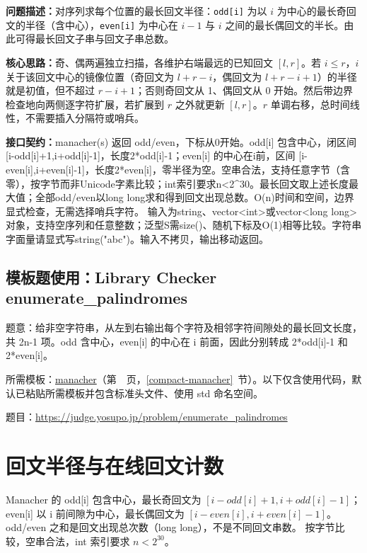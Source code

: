 \noindent\textbf{问题描述：}\allowbreak 对序列求每个位置的最长回文半径：\texttt{odd[i]} 为以 $i$ 为中心的最长奇回文的半径（含中心），\texttt{even[i]} 为中心在 $i-1$ 与 $i$ 之间的最长偶回文的半长。由此可得最长回文子串与回文子串总数。

\textbf{核心思路：}\allowbreak 奇、偶两遍独立扫描，各维护右端最远的已知回文 $[l,r]$。若 $i\le r$，$i$ 关于该回文中心的镜像位置（奇回文为 $l+r-i$，偶回文为 $l+r-i+1$）的半径就是初值，但不超过 $r-i+1$；否则奇回文从 1、偶回文从 0 开始。然后带边界检查地向两侧逐字符扩展，若扩展到 $r$ 之外就更新 $[l,r]$。$r$ 单调右移，总时间线性，不需要插入分隔符或哨兵。



{\sloppy{}\noindent\textbf{接口契约：}manacher(s) 返回 odd/even，下标从0开始。odd[i] 包含中心，闭区间 [i-odd[i]+1,i+odd[i]-1]，长度2*odd[i]-1；even[i] 的中心在i前，区间 [i-even[i],i+even[i]-1]，长度2*even[i]，零半径为空。空串合法，支持任意字节（含零），按字节而非Unicode字素比较；int索引要求n<2\textasciicircum{}30。最长回文取上述长度最大值；全部odd/even以long long求和得到回文出现总数。O(n)时间和空间，边界显式检查，无需选择哨兵字符。 输入为string、vector<int>或vector<long long>对象，支持空序列和任意整数；泛型S需size()、随机下标及O(1)相等比较。字符串字面量请显式写string("abc")。输入不拷贝，输出移动返回。\par}



\Needspace{360pt}

\subsection*{模板题使用：Library Checker enumerate\_palindromes}

\label{usage-example-23}

题意：给非空字符串，从左到右输出每个字符及相邻字符间隙处的最长回文长度，共 2n-1 项。odd 含中心，even[i] 的中心在 i 前面，因此分别转成 2*odd[i]-1 和 2*even[i]。

所需模板：\hyperref[compact-manacher]{manacher}（第~\pageref{compact-manacher}~页，\ref{compact-manacher}~节）。以下仅含使用代码，默认已粘贴所需模板并包含标准头文件、使用 std 命名空间。

题目：\url{https://judge.yosupo.jp/problem/enumerate_palindromes}



\section{回文半径与在线回文计数}\label{knowledge-palindrome}
Manacher 的 odd[i] 包含中心，最长奇回文为 $[i-odd[i]+1,i+odd[i]-1]$；
even[i] 以 i 前间隙为中心，最长偶回文为 $[i-even[i],i+even[i]-1]$。
odd/even 之和是回文出现总次数（long long），不是不同回文串数。
按字节比较，空串合法，int 索引要求 $n<2^{30}$。

